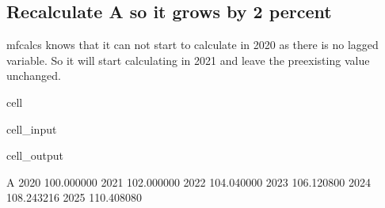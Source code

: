 \documentclass[letterpaper,10pt,english]{jupyterBook}
\begin{document}
\subsection{Recalculate A so  it grows by 2 percent}
\label{\detokenize{content/howto/update/extending_dataframes:recalculate-a-so-it-grows-by-2-percent}}
\sphinxAtStartPar
mfcalcs knows that it can not start to calculate in 2020 as there is no lagged variable. So it will start calculating in 2021 and leave the pre\sphinxhyphen{}existing value unchanged.

\begin{sphinxuseclass}{cell}\begin{sphinxVerbatimInput}

\begin{sphinxuseclass}{cell_input}
\begin{sphinxVerbatim}[commandchars=\\\{\}]
  
\end{sphinxVerbatim}

\end{sphinxuseclass}\end{sphinxVerbatimInput}
\begin{sphinxVerbatimOutput}

\begin{sphinxuseclass}{cell_output}
\begin{sphinxVerbatim}[commandchars=\\\{\}]
               A
2020  100.000000
2021  102.000000
2022  104.040000
2023  106.120800
2024  108.243216
2025  110.408080
\end{sphinxVerbatim}

\end{sphinxuseclass}\end{sphinxVerbatimOutput}

\end{sphinxuseclass}
\end{document}

